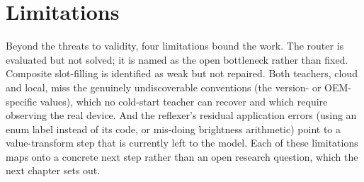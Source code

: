 \section{Limitations}
\label{sec:d-limits}

Beyond the threats to validity, four limitations bound the work. The router is
evaluated but not solved; it is named as the open bottleneck rather than fixed.
Composite slot-filling is identified as weak but not repaired. Both teachers,
cloud and local, miss the genuinely undiscoverable conventions (the version- or
OEM-specific values), which no cold-start teacher can recover and which require
observing the real device. And the reflexer's residual application errors (using
an enum label instead of its code, or mis-doing brightness arithmetic) point to a
value-transform step that is currently left to the model. Each of these limitations
maps onto a concrete next step rather than an open research question, which the
next chapter sets out.
